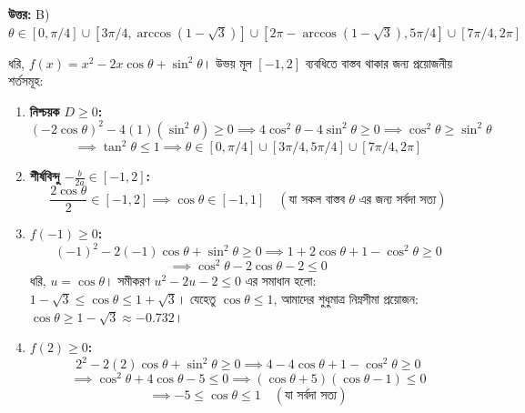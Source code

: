 \documentclass[12pt, a4paper]{article}
\begin{document}
\vspace{0.5em}
\begin{tcolorbox}[answerbox]
    \textbf{\color{success} উত্তর:} B) $\theta \in [0, \pi/4] \cup [3\pi/4, \arccos(1-\sqrt{3})] \cup [2\pi-\arccos(1-\sqrt{3}), 5\pi/4] \cup [7\pi/4, 2\pi]$
\end{tcolorbox}
\vspace{1em}

\begin{tcolorbox}[solutionbox={সমাধান (Solution)}]
    \noindent
    ধরি, $f(x) = x^2 - 2x\cos\theta + \sin^2\theta$। উভয় মূল $[-1, 2]$ ব্যবধিতে বাস্তব থাকার জন্য প্রয়োজনীয় শর্তসমূহ:
    
    \vspace{0.5em}
    \begin{enumerate}[itemsep=0.4em]
        \item \textbf{নিশ্চয়ক $D \ge 0$:} \\
        \[ (-2\cos\theta)^2 - 4(1)(\sin^2\theta) \ge 0 \implies 4\cos^2\theta - 4\sin^2\theta \ge 0 \implies \cos^2\theta \ge \sin^2\theta \]
        \[ \implies \tan^2\theta \le 1 \implies \theta \in [0, \pi/4] \cup [3\pi/4, 5\pi/4] \cup [7\pi/4, 2\pi] \]
        
        \item \textbf{শীর্ষবিন্দু $-\frac{b}{2a} \in [-1, 2]$:} \\
        \[ \frac{2\cos\theta}{2} \in [-1, 2] \implies \cos\theta \in [-1, 1] \quad (\text{যা সকল বাস্তব } \theta \text{ এর জন্য সর্বদা সত্য}) \]
        
        \item \textbf{$f(-1) \ge 0$:} \\
        \[ (-1)^2 - 2(-1)\cos\theta + \sin^2\theta \ge 0 \implies 1 + 2\cos\theta + 1 - \cos^2\theta \ge 0 \]
        \[ \implies \cos^2\theta - 2\cos\theta - 2 \le 0 \]
        ধরি, $u = \cos\theta$। সমীকরণ $u^2 - 2u - 2 \le 0$ এর সমাধান হলো: $1-\sqrt{3} \le \cos\theta \le 1+\sqrt{3}$। 
        যেহেতু $\cos\theta \le 1$, আমাদের শুধুমাত্র নিম্নসীমা প্রয়োজন: $\cos\theta \ge 1-\sqrt{3} \approx -0.732$।
        
        \item \textbf{$f(2) \ge 0$:} \\
        \[ 2^2 - 2(2)\cos\theta + \sin^2\theta \ge 0 \implies 4 - 4\cos\theta + 1 - \cos^2\theta \ge 0 \]
        \[ \implies \cos^2\theta + 4\cos\theta - 5 \le 0 \implies (\cos\theta+5)(\cos\theta-1) \le 0 \]
        \[ \implies -5 \le \cos\theta \le 1 \quad (\text{যা সর্বদা সত্য}) \]
    \end{enumerate}
    

\end{tcolorbox}
\end{document}
